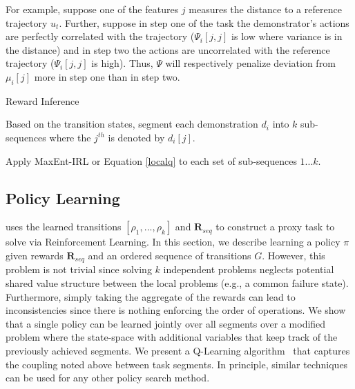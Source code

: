 For example, suppose one of the features $j$ measures the distance to a reference trajectory $u_t$. 
Further, suppose in step one of the task the demonstrator's actions are perfectly correlated with the trajectory ($\Psi_{i}[j,j]$ is low where variance is in the distance) and in step two the actions are uncorrelated with the reference trajectory ($\Psi_{i}[j,j]$ is high).
Thus, $\Psi$ will respectively penalize deviation from $\mu_{i}[j]$ more in step one than in step two.


\begin{algorithmic}[t]
\small
\DontPrintSemicolon
\caption{Reward Inference \label{alg:tsh2}}

Based on the transition states, segment each demonstration $d_i$ into $k$ sub-sequences where the $j^{th}$ is denoted by $d_i[j]$.

Apply MaxEnt-IRL or  Equation \ref{localq} to each set of sub-sequences $1...k$.

\end{algorithmic}



\subsection{Policy Learning}
 \hirl uses the learned transitions $[\rho_1,...,\rho_k]$ and $\mathbf{R}_{seq}$ to construct a proxy task to solve via Reinforcement Learning. In this section, we describe learning a policy $\pi$ given rewards $\mathbf{R}_{seq}$ and an ordered sequence of transitions $G$.
However, this problem is not trivial since solving $k$ independent problems neglects potential shared value structure between the local problems (e.g., a common failure state).
Furthermore, simply taking the aggregate of the rewards can lead to inconsistencies since there is nothing enforcing the order of operations.
We show that a single policy can be learned jointly over all segments over a modified problem where the state-space with additional variables that keep track of the previously achieved segments.
We present a Q-Learning algorithm~\cite{mnih2015human,sutton1998reinforcement} that captures the coupling noted above between task segments.
In principle, similar techniques can be used for any other policy search method.

